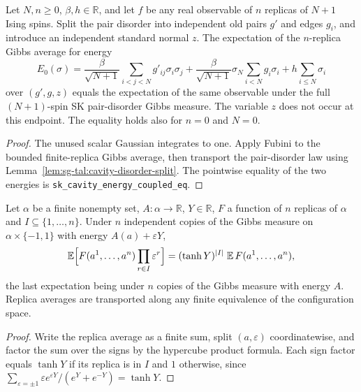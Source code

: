 \begin{lemma}\label{lem:sg-tal:cavity-coupled-endpoint}
  \leanok
{}
Let $N,n\ge0$, $\beta,h\in\mathbb R$, and let $f$ be any real observable
of $n$ replicas of $N+1$ Ising spins. Split the pair disorder into independent
old pairs $g'$ and edges $g_i$, and introduce an independent standard normal
$z$. The expectation of the $n$-replica Gibbs average for energy
\[
E_0(\sigma)=\frac{\beta}{\sqrt{N+1}}
  \sum_{i<j<N}g'_{ij}\sigma_i\sigma_j
 +\frac{\beta}{\sqrt{N+1}}\sigma_N\sum_{i<N}g_i\sigma_i
 +h\sum_{i\le N}\sigma_i
\]
over $(g',g,z)$ equals the expectation of the same observable under the
full $(N+1)$-spin SK pair-disorder Gibbs measure. The variable $z$ does not
occur at this endpoint. The equality holds also for $n=0$ and $N=0$.
\end{lemma}
\begin{proof}
  \leanok
The unused scalar Gaussian integrates to one. Apply Fubini to the bounded
finite-replica Gibbs average, then transport the pair-disorder law using
Lemma~\ref{lem:sg-tal:cavity-disorder-split}. The pointwise equality of the
two energies is \texttt{sk\_cavity\_energy\_coupled\_eq}.
\end{proof}

\begin{lemma}
\label{lem:sg-tal:decoupled-spin}
  \leanok
{}
Let $\alpha$ be a finite nonempty set, $A:\alpha\to\mathbb R$, $Y\in\mathbb R$, $F$ a function of
$n$ replicas of $\alpha$ and $I\subseteq\{1,\dots,n\}$. Under $n$ independent copies of the Gibbs
measure on $\alpha\times\{-1,1\}$ with energy $A(a)+\varepsilon Y$,
\[
\mathbb E\Bigl[F(a^1,\dots,a^n)\prod_{r\in I}\varepsilon^r\Bigr]
=(\tanh Y)^{|I|}\;\mathbb E\,F(a^1,\dots,a^n),
\]
the last expectation being under $n$ copies of the Gibbs measure with energy $A$. Replica averages
are transported along any finite equivalence of the configuration space.
\end{lemma}
\begin{proof}
  \leanok
Write the replica average as a finite sum, split $(a,\varepsilon)$ coordinatewise, and factor the sum
over the signs by the hypercube product formula. Each sign factor equals $\tanh Y$ if its replica is in
$I$ and $1$ otherwise, since $\sum_{\varepsilon=\pm1}\varepsilon e^{\varepsilon Y}/(e^Y+e^{-Y})=\tanh Y$.
\end{proof}

